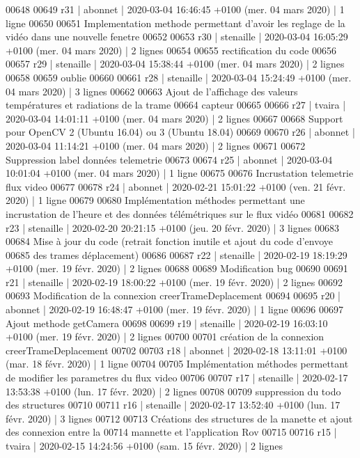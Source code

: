 \begin{DoxyCode}
00648 
00649 r31 | abonnet | 2020-03-04 16:46:45 +0100 (mer. 04 mars 2020) | 1 ligne
00650 
00651 Implementation methode permettant d'avoir les reglage de la vidéo dans une nouvelle fenetre
00652 
00653 r30 | stenaille | 2020-03-04 16:05:29 +0100 (mer. 04 mars 2020) | 2 lignes
00654 
00655 rectification du code
00656 
00657 r29 | stenaille | 2020-03-04 15:38:44 +0100 (mer. 04 mars 2020) | 2 lignes
00658 
00659 oublie
00660 
00661 r28 | stenaille | 2020-03-04 15:24:49 +0100 (mer. 04 mars 2020) | 3 lignes
00662 
00663 Ajout de l'affichage des valeurs températures et radiations de la trame
00664 capteur
00665 
00666 r27 | tvaira | 2020-03-04 14:01:11 +0100 (mer. 04 mars 2020) | 2 lignes
00667 
00668 Support pour OpenCV 2 (Ubuntu 16.04) ou 3 (Ubuntu 18.04)
00669 
00670 r26 | abonnet | 2020-03-04 11:14:21 +0100 (mer. 04 mars 2020) | 2 lignes
00671 
00672 Suppression label données telemetrie
00673 
00674 r25 | abonnet | 2020-03-04 10:01:04 +0100 (mer. 04 mars 2020) | 1 ligne
00675 
00676 Incrustation telemetrie flux video
00677 
00678 r24 | abonnet | 2020-02-21 15:01:22 +0100 (ven. 21 févr. 2020) | 1 ligne
00679 
00680 Implémentation méthodes permettant une incrustation de l'heure et des données télémétriques sur le
       flux vidéo
00681 
00682 r23 | stenaille | 2020-02-20 20:21:15 +0100 (jeu. 20 févr. 2020) | 3 lignes
00683 
00684 Mise à jour du code (retrait fonction inutile et ajout du code d'envoye
00685 des trames déplacement)
00686 
00687 r22 | stenaille | 2020-02-19 18:19:29 +0100 (mer. 19 févr. 2020) | 2 lignes
00688 
00689 Modification bug
00690 
00691 r21 | stenaille | 2020-02-19 18:00:22 +0100 (mer. 19 févr. 2020) | 2 lignes
00692 
00693 Modification de la connexion creerTrameDeplacement
00694 
00695 r20 | abonnet | 2020-02-19 16:48:47 +0100 (mer. 19 févr. 2020) | 1 ligne
00696 
00697 Ajout methode getCamera
00698 
00699 r19 | stenaille | 2020-02-19 16:03:10 +0100 (mer. 19 févr. 2020) | 2 lignes
00700 
00701 création de la connexion creerTrameDeplacement
00702 
00703 r18 | abonnet | 2020-02-18 13:11:01 +0100 (mar. 18 févr. 2020) | 1 ligne
00704 
00705 Implémentation méthodes permettant de modifier les parametres du flux video
00706 
00707 r17 | stenaille | 2020-02-17 13:53:38 +0100 (lun. 17 févr. 2020) | 2 lignes
00708 
00709 suppression du todo des structures
00710 
00711 r16 | stenaille | 2020-02-17 13:52:40 +0100 (lun. 17 févr. 2020) | 3 lignes
00712 
00713 Créations des structures de la manette et ajout des connexion entre la
00714 mannette et l'application Rov
00715 
00716 r15 | tvaira | 2020-02-15 14:24:56 +0100 (sam. 15 févr. 2020) | 2 lignes

\end{DoxyCode}
